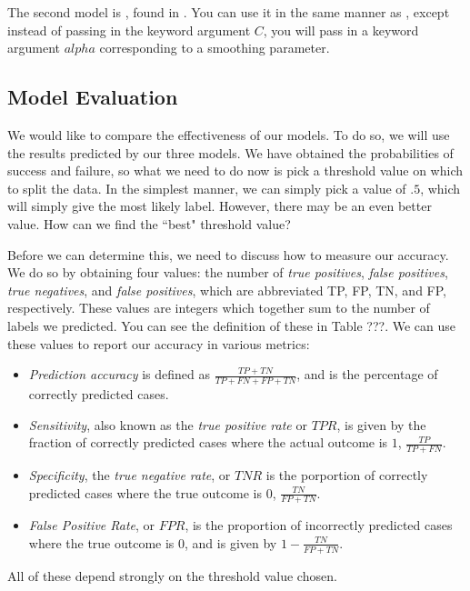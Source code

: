 The second model is , found in .  You can use it in the same manner as , except instead of passing in the keyword argument $C$, you will pass in a keyword argument $alpha$ corresponding to a smoothing parameter.

\subsection*{Model Evaluation}

We would like to compare the effectiveness of our models.  To do so, we will use the results predicted by our three models.  We have obtained the probabilities of success and failure, so what we need to do now is pick a threshold value on which to split the data.  In the simplest manner, we can simply pick a value of $.5$, which will simply give the most likely label.  However, there may be an even better value.  How can we find the ``best" threshold value?

Before we can determine this, we need to discuss how to measure our accuracy.  We do so by obtaining four values: the number of \emph{true positives}, \emph{false positives}, \emph{true negatives}, and \emph{false positives}, which are abbreviated TP, FP, TN, and FP, respectively.  These values are integers which together sum to the number of labels we predicted.  You can see the definition of these in Table ???.  We can use these values to report our accuracy in various metrics:
\begin{itemize}
\item \emph{Prediction accuracy} is defined as $\frac{TP+TN}{TP+FN+FP+TN}$, and is the percentage of correctly predicted cases.
\item \emph{Sensitivity}, also known as the \emph{true positive rate} or $TPR$, is given by the fraction of correctly predicted cases where the actual outcome is $1$, $\frac{TP}{TP+FN}$.
\item \emph{Specificity}, the \emph{true negative rate}, or $TNR$ is the porportion of correctly predicted cases where the true outcome is $0$, $\frac{TN}{FP+TN}$.
\item \emph{False Positive Rate}, or $FPR$, is the proportion of incorrectly predicted cases where the true outcome is $0$, and is given by $1 - \frac{TN}{FP+TN}$.
\end{itemize}
All of these depend strongly on the threshold value chosen.

